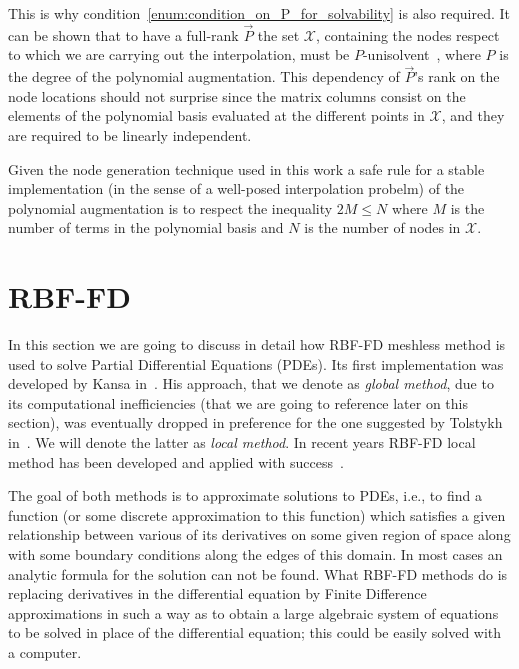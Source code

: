 This is why condition~\ref{enum:condition_on_P_for_solvability} is also required. It can be shown that to have a full-rank $\vec{P}$ the set $\mathcal{X}$, containing the nodes respect to which we are carrying out the interpolation, must be $P$-unisolvent~\cite{Fasshauer:details_on_basic_functions}, where $P$ is the degree of the polynomial augmentation. This dependency of $\vec{P}$'s rank on the node locations should not surprise since the matrix columns consist on the elements of the polynomial basis evaluated at the different points in $\mathcal{X}$, and they are required to be linearly independent.

Given the node generation technique used in this work a safe rule for a stable implementation (in the sense of a well-posed interpolation probelm) of the polynomial augmentation is to respect the inequality $2M \le N$ where $M$ is the number of terms in the polynomial basis and $N$ is the number of nodes in $\mathcal{X}$.



\section{RBF-FD}

In this section we are going to discuss in detail how RBF-FD meshless method is used to solve Partial Differential Equations (PDEs). Its first implementation was developed by Kansa in~\cite{Kansa:RBF_1,Kansa:RBF_2}. His approach, that we denote as \emph{global method}, due to its computational inefficiencies (that we are going to reference later on this section), was eventually dropped in preference for the one suggested by Tolstykh in~\cite{Tolstykh:RBF_local}. We will denote the latter as \emph{local method}. In recent years RBF-FD local method has been developed and applied with success~\cite{Bueno:RBF-FD_application_1,Bueno:RBF-FD_application_2,Kosec:RBF-FD_application_3,Kosec:RBF-FD_application_4}.

The goal of both methods is to approximate solutions to PDEs, i.e., to find a function (or some discrete
approximation to this function) which satisfies a given relationship between various of its derivatives on some given region of space along with some boundary conditions along the edges of this domain. In most cases an analytic formula for the solution can not be found.
What RBF-FD methods do is replacing derivatives in the differential equation by Finite Difference approximations in such a way as to obtain a large algebraic system of equations to be solved in place of the differential equation; this could be easily solved with a computer.


